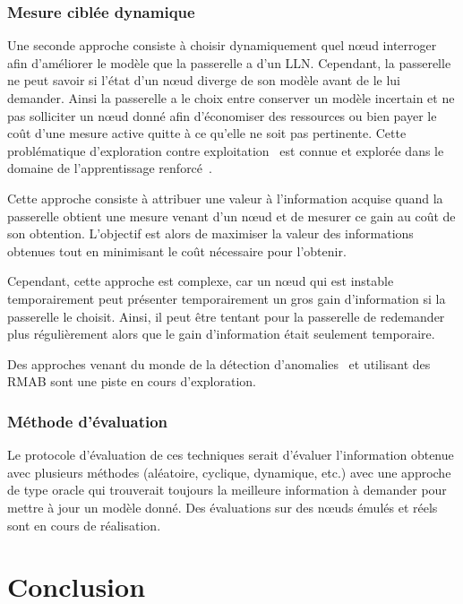 \subsubsection{Mesure ciblée dynamique}

Une seconde approche consiste à choisir dynamiquement quel nœud interroger afin d'améliorer le modèle que la passerelle a d'un \ac{LLN}.
Cependant, la passerelle ne peut savoir si l'état d'un nœud diverge de son modèle avant de le lui demander.
Ainsi la passerelle a le choix entre conserver un modèle incertain et ne pas solliciter un nœud donné afin d'économiser des ressources ou bien payer le coût d'une mesure active quitte à ce qu'elle ne soit pas pertinente.
Cette problématique d'exploration contre exploitation~\cite{liu1112intrusion} est connue et explorée dans le domaine de l'apprentissage renforcé~\cite{posen2012chasing}.

Cette approche consiste à attribuer une valeur à l'information acquise quand la passerelle obtient une mesure venant d'un nœud et de mesurer ce gain au coût de son obtention.
L'objectif est alors de maximiser la valeur des informations obtenues tout en minimisant le coût nécessaire pour l'obtenir.

Cependant, cette approche est complexe, car un nœud qui est instable temporairement peut présenter temporairement un gros gain d'information si la passerelle le choisit.
Ainsi, il peut être tentant pour la passerelle de redemander plus régulièrement alors que le gain d'information était seulement temporaire.

Des approches venant du monde de la détection d'anomalies~\cite{liu1112intrusion} et utilisant des \ac{RMAB} sont une piste en cours d'exploration.

\subsubsection{Méthode d'évaluation}

Le protocole d'évaluation de ces techniques serait d'évaluer l'information obtenue avec plusieurs méthodes (aléatoire, cyclique, dynamique, etc.) avec une approche de type oracle qui trouverait toujours la meilleure information à demander pour mettre à jour un modèle donné.
Des évaluations sur des nœuds émulés et réels sont en cours de réalisation.

\section{Conclusion}
\label{supervision:conclusion}

